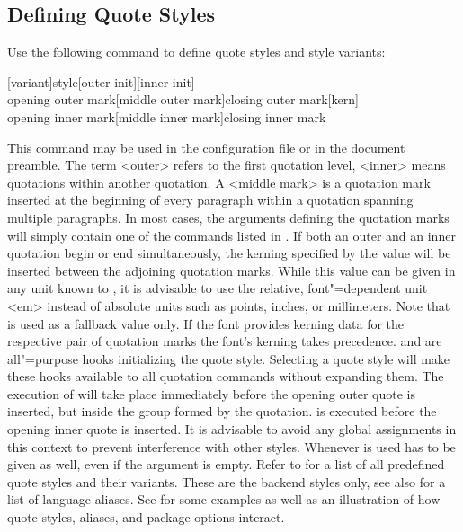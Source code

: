 \documentclass{ltxdockit}[2010/09/26]
\begin{document}
\subsection{Defining Quote Styles}
\label{cfg:sty}

Use the following command to define quote styles and style variants:

\begin{ltxsyntax}

[variant]{style}[outer init][inner init]\\
{opening outer mark}[middle outer mark]{closing outer mark}[kern]\\
{opening inner mark}[middle inner mark]{closing inner mark}

This command may be used in the configuration file or in the document preamble. The term <outer> refers to the first quotation level, <inner> means quotations within another quotation. A <middle mark> is a quotation mark inserted at the beginning of every paragraph within a quotation spanning multiple paragraphs. In most cases, the arguments defining the quotation marks will simply contain one of the commands listed in . If both an outer and an inner quotation begin or end simultaneously, the kerning specified by the value  will be inserted between the adjoining quotation marks. While this value can be given in any unit known to \tex, it is advisable to use the relative, font"=dependent unit <em> instead of absolute units such as points, inches, or millimeters. Note that  is used as a fallback value only. If the font provides kerning data for the respective pair of quotation marks the font's kerning takes precedence.  and  are all"=purpose hooks initializing the quote style. Selecting a quote style will make these hooks available to all quotation commands without expanding them. The execution of  will take place immediately before the opening outer quote is inserted, but inside the group formed by the quotation.  is executed before the opening inner quote is inserted. It is advisable to avoid any global assignments in this context to prevent interference with other styles. Whenever  is used  has to be given as well, even if the argument is empty. Refer to  for a list of all predefined quote styles and their variants. These are the backend styles only, see also  for a list of language aliases. See  for some examples as well as an illustration of how quote styles, aliases, and package options interact.

\end{ltxsyntax}
\end{document}
